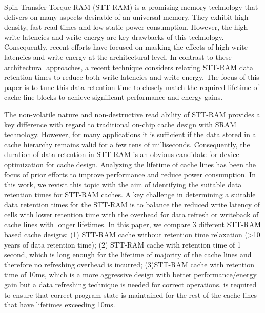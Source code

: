 
Spin-Transfer Torque RAM (STT-RAM) is a promising memory technology that
delivers on many aspects desirable of an universal memory. They exhibit
high density, fast read times and low static power consumption. However,
the high write latencies and write energy are key drawbacks of this
technology. Consequently, recent efforts have focused on masking the
effects of high write latencies and write energy at the architectural level.
In contrast to these architectural approaches, a recent technique
considers relaxing STT-RAM data retention times to reduce both write
latencies and write energy. The focus of this paper is  to tune this data retention
time to closely match the required lifetime of cache line blocks to
achieve significant performance and energy gains.

The non-volatile nature and non-destructive read ability of  STT-RAM
provides a key difference with regard to traditional on-chip cache design with
SRAM technology. However, for many applications it is sufficient if the data
stored in a cache hierarchy remains valid for a few tens of
milliseconds. Consequently, the duration of data retention in STT-RAM is
an obvious candidate for device optimization for cache design.
%
%
Analyzing the lifetime of cache lines has been the focus of prior
efforts to improve performance and reduce power consumption. In this
work, we
revisit this topic with the aim of identifying the suitable data
retention times for STT-RAM caches. A key challenge in determining a
suitable
data retention times for the STT-RAM is to balance the reduced write
latency of cells with lower retention time with the overhead for data
refresh or
writeback of cache lines with longer lifetimes. In this paper, we compare 3 different 
STT-RAM based cache designs: (1) STT-RAM cache without retention time relaxation 
(>10 years of data retention time); (2) STT-RAM cache with retention time of 
1 second, which is long enough for the lifetime of majority of the cache lines and
therefore no refreshing overhead is incurred;
(3)STT-RAM cache with retention time of 10ms, which is a more aggressive design
with better performance/energy gain but a data refreshing technique is needed for
correct operations.
is required to ensure that correct program state is maintained for the rest of the cache lines
that have lifetimes exceeding 10ms.


